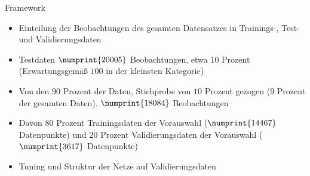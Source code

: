 \documentclass[8pt, xcolor = dvipsnames]{beamer}
\begin{document}
\begin{frame}{Framework}
\begin{itemize}
    \item Einteilung der  Beobachtungen des gesamten Datensatzes in Trainings-, Test- und Validierungsdaten \item Testdaten $\numprint{20005}$ Beobachtungen, etwa 10 Prozent (Erwartungsgemäß $100$ in der kleinsten Kategorie)
    \item Von den $90$ Prozent der Daten, Stichprobe von $10$ Prozent gezogen ($9$ Prozent der gesamten Daten). $\numprint{18084}$ Beobachtungen
    \item Davon $80$ Prozent Trainingsdaten der Vorauswahl ($\numprint{14467}$ Datenpunkte) und $20$ Prozent  Validierungsdaten der Vorauswahl ($\numprint{3617}$ Datenpunkte)
    \item Tuning und Struktur der Netze auf Validierungsdaten
\end{itemize}{}
\end{frame}{}
\end{document}
